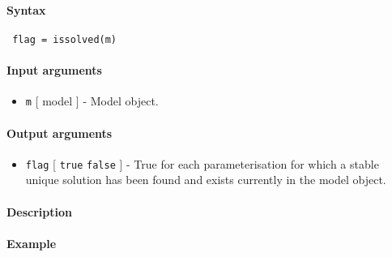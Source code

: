 


	\paragraph{Syntax}
 
 \begin{verbatim}
 flag = issolved(m)
 \end{verbatim}
 
 \paragraph{Input arguments}
 
 \begin{itemize}
 \item
   \texttt{m} {[} model {]} - Model object.
 \end{itemize}
 
 \paragraph{Output arguments}
 
 \begin{itemize}
 \item
   \texttt{flag} {[} \texttt{true} \textbar{} \texttt{false} {]} - True
   for each parameterisation for which a stable unique solution has been
   found and exists currently in the model object.
 \end{itemize}
 
 \paragraph{Description}
 
 \paragraph{Example}


